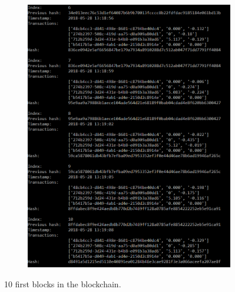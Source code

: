 \begin{figure}\ContinuedFloat
\begin{subfigure}[b]{1\textwidth}
  \includegraphics[width=1\linewidth]{Images/tx_2}
\end{subfigure}
\caption{10 first blocks in the blockchain.}
\label{fig:chain}
\end{figure}


